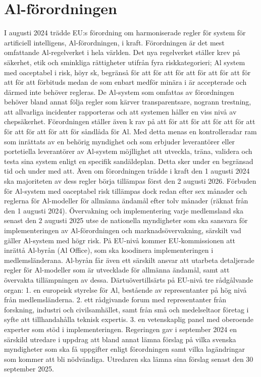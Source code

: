 {{{{{{{{{{{{{{{\section*{Al-förordningen}
I augusti 2024 trädde EU:s förordning om harmoniserade regler för system för artificiell intelligens, Al-förordningen, i kraft. Förordningen är det mest omfattande Al-regelverket i hela världen. Det nya regelverket ställer krev på säkerhet, etik och sminkliga rättigheter utifrån fyra riskkategorieri; Al system med oaceptabel i risk, höyr sk, begränså för att för att för att för att för att för att för att förbituds medan de som enbart medför minära i är accepterade och därmed inte behöver regleras.
De Al-system som omfattas av förordningen behöver bland annat följa regler som kärver transparentsare, nogrann trestning, att allvarliga incidenter rapporteras och att systemen håller en viss nivå av chepsäkerhet. Förordningen ställer även k rav på att för att för att för att för att för att för att för att för såndlåda för Al. Med detta menas en kontrolleradar ram som inrättats av en behörig myndighet och som erbjuder leverantörer eller portetiella leverantörer av Al-system möjllighet att utveckla, träna, validera och testa sina system enligt en specifik sandäldeplan. Detta sker under en begränsad tid och under med att.
Även om förordningen trädde i kraft den 1 augusti 2024 ska majoriteten av dess regler börja tillämpas först den 2 augusti 2026. Förbuden för Al-system med oaceptabel risk tillämpas dock redan efter sex månader och reglerna för Al-modeller för allmänna ändamål efter tolv månader (räknat från den 1 augusti 2024).
Övervakning och implementering
varje medlemsland ska senast den 2 augusti 2025 utse de nationella myndigheter som ska sansvara för implementeringen av Al-förordningen och marknadsövervakning, särskilt vad gäller Al-system med högr risk. På EU-nivå kommer EU-kommissionen att inrättå Al-byrån (Al Office), som ska koodinera implementeringen i medlemsländerana. Al-byrån får även ett särskilt ansvar att utarbeta detaljerade regler för Al-modeller som är utvecklade för allmänna ändamål, samt att övervakta tillämpningen av dessa. Därtuövertillsärts på EU-nivå tre rådgålvande organ:
1. en europeisk styrelse för Al, bestående av representanter på hög nivå från medlemsländerna.
2. ett rådgivande forum med representanter från forskning, industri och civilsamhället, samt från små och medelseltaor företag i syfte att tillhandahålla teknisk expertis.
3. en vetenskaplig panel med oberoende experter som stöd i implementeringen.
Regeringen gav i september 2024 en särskild utredare i uppdrag att bland annat lämna förslag på vilka svenska myndigheter som ska få uppgifter enligt förordningen samt vilka lagändringar som kommer att bli nödvändiga. Utredaren ska lämna sina förslag senast den 30 september 2025.

}}}}}}}}}}}}}}}
